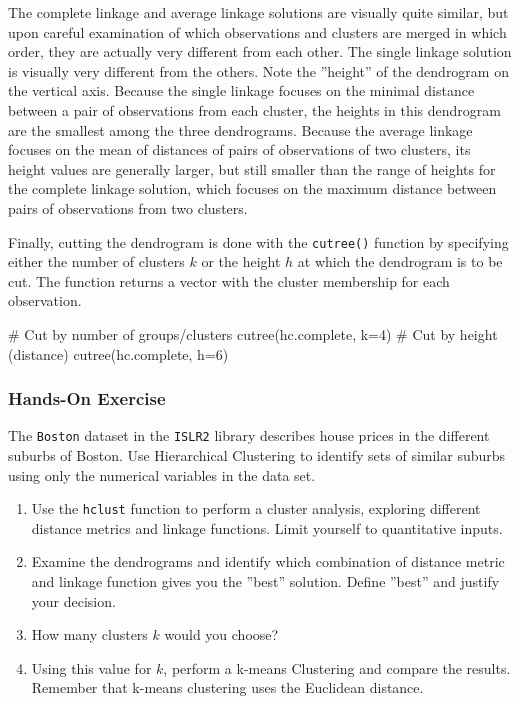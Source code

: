 The complete linkage and average linkage solutions are visually quite similar, but upon careful examination of which observations and clusters are merged in which order, they are actually very different from each other. The single linkage solution is visually very different from the others. Note the ''height'' of the dendrogram on the vertical axis. Because the single linkage focuses on the minimal distance between a pair of observations from each cluster, the heights in this dendrogram are the smallest among the three dendrograms. Because the average linkage focuses on the mean of distances of pairs of observations of two clusters, its height values are generally larger, but still smaller than the range of heights for the complete linkage solution, which focuses on the maximum distance between pairs of observations from two clusters. 

Finally, cutting the dendrogram is done with the \texttt{cutree()} function by specifying either the number of clusters $k$ or the height $h$ at which the dendrogram is to be cut. The function returns a vector with the cluster membership for each observation.

\begin{samepage}
\begin{Rcode}
# Cut by number of groups/clusters
cutree(hc.complete, k=4)
# Cut by height (distance)
cutree(hc.complete, h=6)
\end{Rcode}
\end{samepage}

\begin{tcolorbox}[colback=code]
\subsubsection*{Hands-On Exercise} 
The \texttt{Boston} dataset in the \texttt{ISLR2} library describes house prices in the different suburbs of Boston. Use Hierarchical Clustering to identify sets of similar suburbs using only the numerical variables in the data set.
\begin{enumerate}
   \item Use the \texttt{hclust} function to perform a cluster analysis, exploring different distance metrics and linkage functions. Limit yourself to quantitative inputs.
   \item Examine the dendrograms and identify which combination of distance metric and linkage function gives you the ''best'' solution. Define ''best'' and justify your decision.
   \item How many clusters $k$ would you choose?
   \item Using this value for $k$, perform a k-means Clustering and compare the results. Remember that k-means clustering uses the Euclidean distance.
\end{enumerate}
\end{tcolorbox}

